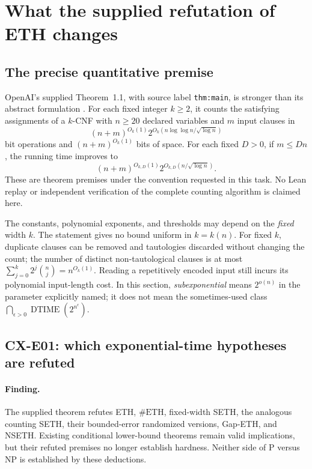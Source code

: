\section{What the supplied refutation of ETH changes}
\label{sec:eth}

\subsection{The precise quantitative premise}

OpenAI's supplied Theorem~1.1, with source label
\texttt{thm:main}, is stronger than its abstract formulation
\cite[Theorem~1.1]{OpenAIETH}.
For each fixed integer \(k\geq2\), it counts the satisfying assignments of a
\(k\)-CNF with \(n\geq20\) declared variables and \(m\) input clauses in
\[
 (n+m)^{O_k(1)}
 2^{O_k(n\log\log n/\sqrt{\log n})}
\]
bit operations and \((n+m)^{O_k(1)}\) bits of space.
For each fixed \(D>0\), if \(m\leq Dn\), the running time improves to
\[
 (n+m)^{O_{k,D}(1)}2^{O_{k,D}(n/\sqrt{\log n})}.
\]
These are theorem premises under the convention requested in this task.
No Lean replay or independent verification of the complete counting
algorithm is claimed here.

The constants, polynomial exponents, and thresholds may depend on the
\emph{fixed} width \(k\). The statement gives no bound uniform in
\(k=k(n)\). For fixed \(k\), duplicate clauses can be removed and
tautologies discarded without changing the count; the number of distinct
non-tautological clauses is at most
\(\sum_{j=0}^{k}2^j\binom nj=n^{O_k(1)}\).
Reading a repetitively encoded input still incurs its polynomial
input-length cost. In this section, \emph{subexponential} means
\(2^{o(n)}\) in the parameter explicitly named; it does not mean the
sometimes-used class
\(\bigcap_{\epsilon>0}\operatorname{DTIME}(2^{n^\epsilon})\).

\subsection{CX-E01: which exponential-time hypotheses are refuted}
\label{finding:CX-E01}

\paragraph{Finding.}
The supplied theorem refutes ETH, \(\#\mathrm{ETH}\), fixed-width SETH,
the analogous counting SETH, their bounded-error randomized versions,
Gap-ETH, and NSETH. Existing conditional lower-bound theorems remain
valid implications, but their refuted premises no longer establish
hardness. Neither side of \(\mathrm P\) versus \(\mathrm{NP}\) is
established by these deductions.


